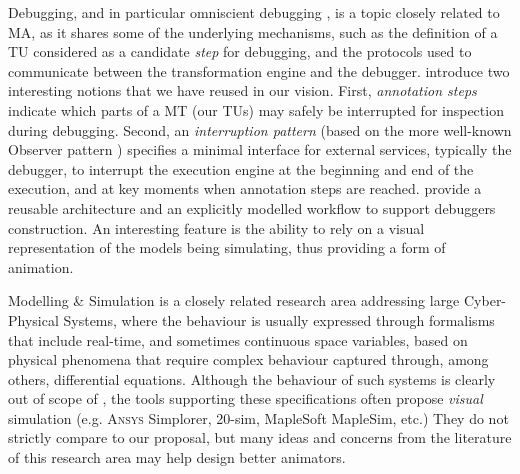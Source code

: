 Debugging, and in particular omniscient debugging 
\citep{bousse2018omniscient,J:Corley-Eddy-Syriani-Grey:2016,J:VanMierlo-Vangheluwe-etAl:2020},
is a topic closely related to MA, as it shares some of the underlying mechanisms,
such as the definition of a TU considered as a candidate \emph{step} for debugging,
and the protocols used to communicate between the transformation engine and the debugger.
\citet{bousse2018omniscient} introduce two interesting notions that we have reused
in our vision. First, \emph{annotation steps} indicate which parts of a MT (our TUs) may safely
be interrupted for inspection during debugging. Second, an \emph{interruption pattern}
(based on the more well-known Observer pattern \cite{B:Gamma-etAl:1995}) specifies
a minimal interface for external services, typically the debugger, to interrupt
the execution engine at the beginning and end of the execution, and at key moments
when annotation steps are reached. \citet{J:VanMierlo-Vangheluwe-etAl:2020} provide
a reusable architecture and an explicitly modelled workflow to support debuggers
construction. An interesting feature is the ability to rely on a visual representation
of the models being simulating, thus providing a form of animation.

Modelling \& Simulation \cite{B:Birta-Arbez:2019} is a closely related research 
area addressing large Cyber-Physical Systems, where the behaviour is usually expressed
through formalisms that include real-time, and sometimes continuous space variables,
based on physical phenomena that require complex behaviour captured through, among
others, differential equations. Although the behaviour of such systems is clearly
out of scope of \MDE, the tools supporting these specifications often propose 
\emph{visual} simulation (e.g. \textsc{Ansys} Simplorer, 20-sim, MapleSoft MapleSim, etc.)
They do not strictly compare to our proposal, but many ideas and concerns from the
literature of this research area may help design better animators. 

